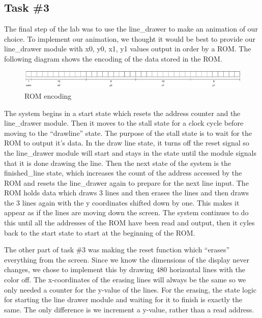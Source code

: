\documentclass[11pt, titlepage]{article}
\begin{document}
        \subsection{Task \#3}
            The final step of the lab was to use the line\_drawer to make an animation of our choice. To implement our animation, we thought it would be best to provide our line\_drawer module with x0, y0, x1, y1 values output in order by a ROM. The following diagram shows the encoding of the data stored in the ROM. 
            \begin{figure}[H]
                \centering
                \includegraphics[scale = 0.41]{Images/ROM encoding.pdf}
                \caption{ROM encoding}
            \end{figure}
            The system begins in a start state which resets the address counter and the line\_drawer module. Then it moves to the stall state for a clock cycle before moving to the “drawline” state. The purpose of the stall state is to wait for the ROM to output it's data. In the draw line state, it turns off the reset signal so the line\_drawer module will start and stays in the state until the module signals that it is done drawing the line. Then the next state of the system is the finished\_line state, which increases the count of the address accessed by the ROM and resets the line\_drawer again to prepare for the next line input. The ROM holds data which draws 3 lines and then erases the lines and then draws the 3 lines again with the y coordinates shifted down by one. This makes it appear as if the lines are moving down the screen. The system continues to do this until all the addresses of the ROM have been read and output, then it cyles back to the start state to start at the beginning of the ROM. 

            The other part of task \#3 was making the reset function which ``erases'' everything from the screen. Since we know the dimensions of the display never changes, we chose to implement this by drawing 480 horizontal lines with the color off. The x-coordinates of the erasing lines will always be the same so we only needed a counter for the y-value of the lines. For the erasing, the state logic for starting the line drawer module and waiting for it to finish is exactly the same. The only difference is we increment a y-value, rather than a read address. 
\end{document}
